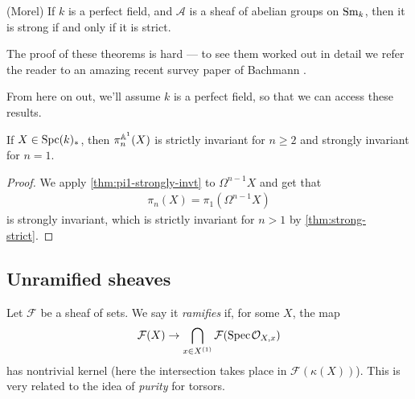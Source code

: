 \documentclass[11pt,openany]{book}
\begin{document}
\begin{theorem}\label{thm:strong-strict}
(Morel)
If $k$ is a perfect field, and $\mathcal{A}$ is a sheaf of abelian groups on $\mathrm{Sm}_k$, then it is strong if and only if it is strict.
\end{theorem}

The proof of these theorems is hard --- to see them worked out in detail we refer the reader to an amazing recent survey paper of Bachmann \cite{bachmannstrongly}.



\begin{assumption} From here on out, we'll assume $k$ is a perfect field, so that we can access these results.
\end{assumption}


\begin{corollary} If $X\in \mathrm{Spc}(k)_\ast$, then $\pi_n^{\mathbb{A}^1}(X)$ is strictly invariant for $n\ge 2$ and strongly invariant for $n=1$.
\end{corollary}
\begin{proof} We apply \autoref{thm:pi1-strongly-invt} to $\Omega^{n-1}X$ and get that
\begin{align*}
    \pi_n(X) = \pi_1(\Omega^{n-1} X)
\end{align*}
is strongly invariant, which is strictly invariant for $n>1$ by \autoref{thm:strong-strict}.
\end{proof}




\subsection{Unramified sheaves}



Let $\mathcal{F}$ be a sheaf of sets. We say it \textit{ramifies} if, for some $X$, the map
\begin{align*}
    \mathcal{F}(X) \to \bigcap_{x\in X^{(1)}} \mathcal{F}(\text{Spec}\hspace{0.1em} \mathcal{O}_{X,x})
\end{align*}
has nontrivial kernel (here the intersection takes place in $\mathcal{F}(\kappa(X))$). This is very related to the idea of \textit{purity} for torsors.
\end{document}
